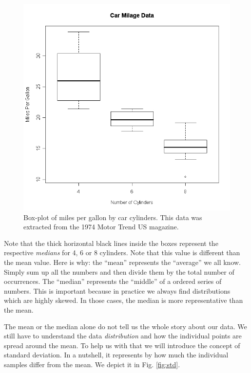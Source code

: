 \begin{figure}[h]
	\begin{center}
			\includegraphics[scale=0.3]{Parts/ch2/milleagech2}
	\end{center}
	\caption{Box-plot of miles per gallon by car cylinders. This data was extracted from the 1974 Motor Trend US magazine.}
	\label{fig:boxplot}
\end{figure} 

Note that the thick horizontal black lines inside the boxes represent the respective \textit{medians} for 4, 6 or 8 cylinders. Note that this value is different than the mean value. Here is why: the ``mean'' represents the ``average'' we all know. Simply sum up all the numbers and then divide them by the total number of occurrences. The ``median'' represents the ``middle'' of a ordered series of numbers. This is important because in practice we always find distributions which are highly skewed. In those cases, the median is more representative than the mean.

The mean or the median alone do not tell us the whole story about our data. We still have to understand the data \textit{distribution} and how the individual points are spread around the mean. To help us with that we will introduce the concept of standard deviation. In a nutshell, it represents by how much the individual samples differ from the mean. We depict it in Fig. \ref{fig:std}.

